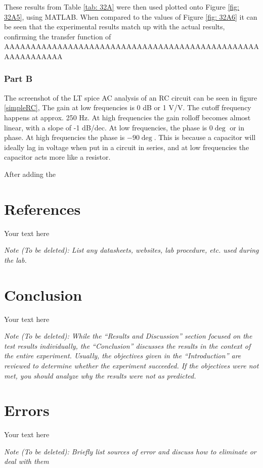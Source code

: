 \documentclass[10pt]{article}
\begin{document}
These results from Table \ref{tab: 32A} were then used plotted onto Figure \ref{fig: 32A5}, using MATLAB. When compared to the values of Figure \ref{fig: 32A6} it can be seen that the experimental results match up with the actual results, confirming the transfer function of AAAAAAAAAAAAAAAAAAAAAAAAAAAAAAAAAAAAAAAAAAAAAAAAAAAAAAAAAAA

\subsubsection{Part B}

The screenshot of the LT spice AC analysis of an RC circuit can be seen in figure \ref{simpleRC}, The gain at low frequencies is 0 dB or 1 V/V. The cutoff frequency happens at approx. 250 Hz. At high frequencies the gain rolloff becomes almost linear, with a slope of -1 dB/dec. At low frequencies, the phase is $0\deg$ or in phase. At high frequencies the phase is $-90\deg$. This is because a capacitor will ideally lag in voltage when put in a circuit in series, and at low frequencies the capacitor acts more like a resistor.

After adding the  


\section{References}

Your text here

\medskip

\textit{Note (To be deleted): List any datasheets, websites, lab procedure, etc. used during the lab.}

\section{Conclusion}

Your text here

\medskip

\textit{Note (To be deleted): While the ``Results and Discussion'' section focused on the test results individually, the ``Conclusion'' discusses the results in the context of the entire experiment. Usually, the objectives given in the ``Introduction'' are reviewed to determine whether the experiment succeeded. If the objectives were not met, you should analyze why the results were not as predicted.}

\section{Errors}

Your text here

\medskip

\textit{Note (To be deleted): Briefly list sources of error and discuss how to eliminate or deal with them}
\end{document}
